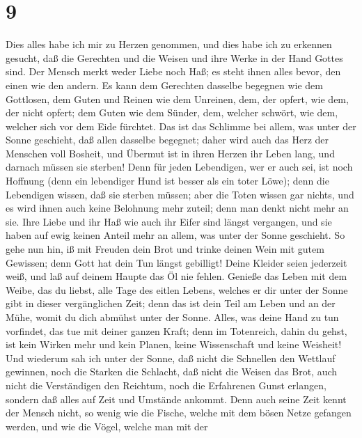 \hypertarget{section-8}{%
\section{9}\label{section-8}}

 Dies alles habe ich mir zu Herzen genommen, und dies habe
ich zu erkennen gesucht, daß die Gerechten und die Weisen und ihre Werke
in der Hand Gottes sind. Der Mensch merkt weder Liebe noch Haß; es steht
ihnen alles bevor, den einen wie den andern.  Es kann dem
Gerechten dasselbe begegnen wie dem Gottlosen, dem Guten und Reinen wie
dem Unreinen, dem, der opfert, wie dem, der nicht opfert; dem Guten wie
dem Sünder, dem, welcher schwört, wie dem, welcher sich vor dem Eide
fürchtet.  Das ist das Schlimme bei allem, was unter der
Sonne geschieht, daß allen dasselbe begegnet; daher wird auch das Herz
der Menschen voll Bosheit, und Übermut ist in ihren Herzen ihr Leben
lang, und darnach müssen sie sterben!  Denn für jeden
Lebendigen, wer er auch sei, ist noch Hoffnung (denn ein lebendiger Hund
ist besser als ein toter Löwe);  denn die Lebendigen
wissen, daß sie sterben müssen; aber die Toten wissen gar nichts, und es
wird ihnen auch keine Belohnung mehr zuteil; denn man denkt nicht mehr
an sie.  Ihre Liebe und ihr Haß wie auch ihr Eifer sind
längst vergangen, und sie haben auf ewig keinen Anteil mehr an allem,
was unter der Sonne geschieht.  So gehe nun hin, iß mit
Freuden dein Brot und trinke deinen Wein mit gutem Gewissen; denn Gott
hat dein Tun längst gebilligt!  Deine Kleider seien
jederzeit weiß, und laß auf deinem Haupte das Öl nie fehlen.
 Genieße das Leben mit dem Weibe, das du liebst, alle Tage
des eitlen Lebens, welches er dir unter der Sonne gibt in dieser
vergänglichen Zeit; denn das ist dein Teil am Leben und an der Mühe,
womit du dich abmühst unter der Sonne.  Alles, was deine
Hand zu tun vorfindet, das tue mit deiner ganzen Kraft; denn im
Totenreich, dahin du gehst, ist kein Wirken mehr und kein Planen, keine
Wissenschaft und keine Weisheit!  Und wiederum sah ich
unter der Sonne, daß nicht die Schnellen den Wettlauf gewinnen, noch die
Starken die Schlacht, daß nicht die Weisen das Brot, auch nicht die
Verständigen den Reichtum, noch die Erfahrenen Gunst erlangen, sondern
daß alles auf Zeit und Umstände ankommt.  Denn auch seine
Zeit kennt der Mensch nicht, so wenig wie die Fische, welche mit dem
bösen Netze gefangen werden, und wie die Vögel, welche man mit der
